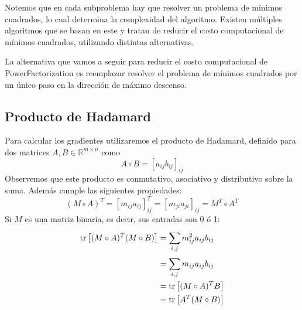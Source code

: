 Notemos que en cada subproblema hay que resolver un problema de mínimos cuadrados, lo cual determina la complexidad del algoritmo. Existen múltiples algoritmos que se basan en este y tratan de reducir el costo computacional de mínimos cuadrados, utilizando distintas alternativas.

La alternativa que vamos a seguir para reducir el costo computacional de PowerFactorization es reemplazar resolver el problema de mínimos cuadrados por un único paso en la dirección de máximo descenso. 
%

\subsection{Producto de Hadamard}

Para calcular los gradientes utilizaremos el producto de Hadamard, definido para dos matrices $A, B \in \mathbb{R}^{m \times n}$ como
\begin{equation*}
    A \circ B = \left[a_{ij}b_{ij}\right]_{ij}
\end{equation*}
Observemos que este producto es conmutativo, asociativo y distributivo sobre la
suma. 
Además cumple las siguientes propiedades:
\begin{equation*}
    (M \circ A)^T = \left[ m_{ij} a_{ij} \right]_{ij}^T = \left[ m_{ji} a_{ji} \right]_{ij} = M^T \circ A^T
\end{equation*}
Si $M$ es una matriz binaria, es decir, sus entradas son 0 ó 1:
\begin{align*}
    \operatorname{tr}\left[ (M \circ A)^T (M \circ B) \right] &= \sum_{i,j}^{} m_{ij}^2 a_{ij} b_{ij} \\
                                                &= \sum_{i,j}^{} m_{ij} a_{ij} b_{ij} \\
                                                &= \operatorname{tr} \left[ (M\circ A)^T B \right] \\
                                                &= \operatorname{tr} \left[ A^T (M\circ B) \right] \\
\end{align*}

